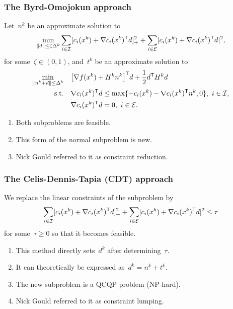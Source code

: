 \documentclass{polyu-presentation}
\newcommand{\con}[1]{c_{#1}}
\newcommand{\ieq}{\mathcal{E}}
\newcommand{\iub}{\mathcal{I}}
\newcommand{\obj}{f}
\begin{document}
\begin{frame}
    \frametitle{The Byrd-Omojokun approach}

    Let~$n^k$ be an approximate solution to
    \begin{equation*}
        \min_{\norm{d} \le \zeta \Delta^k} \sum_{i \in \iub} \posp{\con{i}(x^k) + \nabla \con{i}(x^k)^{\T} d}^2 + \sum_{i \in \ieq} \abs{\con{i}(x^k) + \nabla \con{i}(x^k)^{\T} d}^2,
    \end{equation*}
    for some~$\zeta \in (0, 1)$, and~$t^k$ be an approximate solution to
    \begin{align*}
        \min_{\norm{n^k + d} \le \Delta^k}  & \quad \big[ \nabla \obj(x^k) + H^k n^k \big]^{\T} d + \frac{1}{2} d^{\T} H^k d\\
        \text{s.t.}                         & \quad \nabla \con{i}(x^k)^{\T} d \le \max \set{- \con{i}(x^k) - \nabla \con{i}(x^k)^{\T} n^k, 0}, ~ i \in \iub,\\
                                            & \quad \nabla \con{i}(x^k)^{\T} d = 0, ~ i \in \ieq.
    \end{align*}

    \begin{block}{}
        \begin{enumerate}[<+(1)->]
            \item Both subproblems are \alert{feasible}.
            \item This form of the normal subproblem is \alert{new}.
            \item Nick Gould referred to it as \alert{constraint reduction}.
        \end{enumerate}
    \end{block}
\end{frame}

\begin{frame}
    \frametitle{The Celis-Dennis-Tapia (CDT) approach}

    We \alert{replace} the linear constraints of the subproblem by
    \begin{equation*}
        \sum_{i \in \iub} \posp{\con{i}(x^k) + \nabla \con{i}(x^k)^{\T} d}^2 + \sum_{i \in \ieq} \abs{\con{i}(x^k) + \nabla \con{i}(x^k)^{\T} d}^2 \le \tau
    \end{equation*}
    for some~$\tau \ge 0$ so that it becomes feasible.

    \medskip

    \begin{block}{}
        \begin{enumerate}[<+(1)->]
            \item This method \alert{directly} sets~$d^k$ after determining~$\tau$.
            \item It can theoretically be \alert{expressed} as~$d^k = n^k + t^k$.
            \item The new subproblem is a \alert{QCQP} problem (NP-hard).
            \item Nick Gould referred to it as \alert{constraint lumping}.
        \end{enumerate}
    \end{block}
\end{frame}
\end{document}
